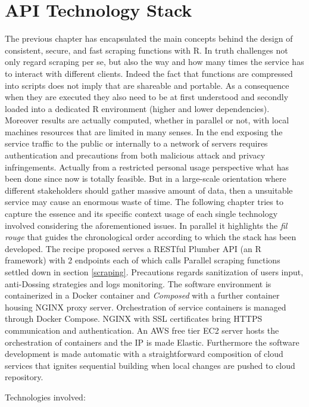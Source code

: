\documentclass[
  12pt,
  a4paper,
  oneside]{book}
\theoremstyle{definition}
\theoremstyle{definition}
\theoremstyle{definition}
\theoremstyle{remark}
\begin{document}
\hypertarget{Infrastructure}{%
\chapter{API Technology Stack}\label{Infrastructure}}

The previous chapter has encapsulated the main concepts behind the design of consistent, secure, and fast scraping functions with R. In truth challenges not only regard scraping per se, but also the way and how many times the service has to interact with different clients. Indeed the fact that functions are compressed into scripts does not imply that are shareable and portable. As a consequence when they are executed they also need to be at first understood and secondly loaded into a dedicated R environment (higher and lower dependencies). Moreover results are actually computed, whether in parallel or not, with local machines resources that are limited in many senses. In the end exposing the service traffic to the public or internally to a network of servers requires authentication and precautions from both malicious attack and privacy infringements. Actually from a restricted personal usage perspective what has been done since now is totally feasible. But in a large-scale orientation where different stakeholders should gather massive amount of data, then a unsuitable service may cause an enormous waste of time.
The following chapter tries to capture the essence and its specific context usage of each single technology involved considering the aforementioned issues. In parallel it highlights the \emph{fil rouge} that guides the chronological order according to which the stack has been developed.
The recipe proposed serves a RESTful Plumber API (an R framework) with 2 endpoints each of which calls Parallel scraping functions settled down in section \ref{scraping}. Precautions regards sanitization of users input, anti-Dossing strategies and logs monitoring. The software environment is containerized in a Docker container and \emph{Composed} with a further container housing NGINX proxy server. Orchestration of service containers is managed through Docker Compose. NGINX with SSL certificates bring HTTPS communication and authentication. An AWS free tier EC2 server hosts the orchestration of containers and the IP is made Elastic. Furthermore the software development is made automatic with a straightforward composition of cloud services that ignites sequential building when local changes are pushed to cloud repository.

Technologies involved:
\end{document}
